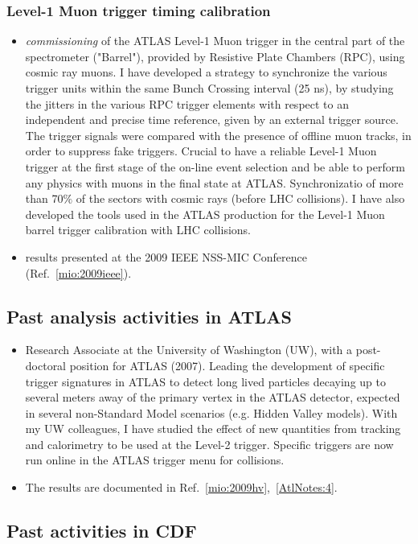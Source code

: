 \documentclass{article}
\begin{document}
\begin{vita}
\subsubsection*{Level-1 Muon trigger timing calibration}
\begin{itemize}
\item {\it commissioning} of the ATLAS Level-1 Muon trigger in the central part of the spectrometer ("Barrel"), provided by 
Resistive Plate Chambers (RPC), using cosmic ray muons.  I have developed a strategy to synchronize the various trigger units within 
the same Bunch Crossing interval (25 ns), by studying the jitters in the various RPC trigger elements with respect 
to an independent and precise time reference, given by an external trigger source. The trigger signals were compared with the presence of 
 offline muon tracks, in order to suppress fake triggers. Crucial to have a reliable Level-1 Muon trigger at 
the first stage of the on-line event selection and be able to perform any physics with muons in the final state at ATLAS. Synchronizatio of more than 70$\%$ of the sectors with cosmic rays (before LHC collisions). I have also developed the tools used in the ATLAS production for the Level-1 Muon barrel trigger
calibration with LHC collisions. 
\item results presented at the 2009 IEEE NSS-MIC Conference (Ref.~\ref{mio:2009ieee}).
\end{itemize}

\subsection*{Past analysis activities in ATLAS}
\begin{itemize}
\item Research Associate at the University of Washington (UW), with a post-doctoral position for ATLAS (2007). 
Leading the development of specific trigger signatures in ATLAS to detect long lived particles decaying up to several meters away of the primary vertex in the ATLAS detector, expected in several non-Standard Model scenarios (e.g. Hidden Valley models). 
With my UW colleagues, I have studied the effect of new quantities from tracking and calorimetry to be used at the Level-2 trigger. Specific triggers are now run online in the ATLAS trigger menu for collisions. 
\item The results are documented in Ref.~\ref{mio:2009hv},~\ref{AtlNotes:4}. 
\end{itemize}

\subsection*{Past activities in CDF}

\end{vita}
\end{document}
